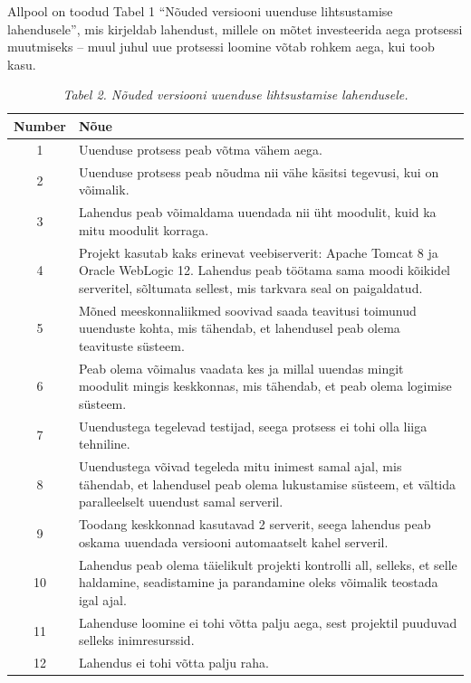 \documentclass[12pt]{report}
\begin{document}
  Allpool on toodud Tabel 1 ``Nõuded versiooni uuenduse lihtsustamise lahendusele'', mis kirjeldab lahendust, millele on mõtet investeerida aega protsessi muutmiseks \--- muul juhul uue protsessi loomine võtab rohkem aega, kui toob kasu.
  
  \begin{table}
    \caption*{\textit{Tabel 2. Nõuded versiooni uuenduse lihtsustamise lahendusele.}}
    
    \begin{tabular}{|c|p{11cm}|}
      \hline
      \textbf{Number} & \textbf{Nõue}\\
      \hline
      1 & Uuenduse protsess peab võtma vähem aega.\\
      \hline
      2 & Uuenduse protsess peab nõudma nii vähe käsitsi tegevusi, kui on võimalik.\\
      \hline
      3 & Lahendus peab võimaldama uuendada nii üht moodulit, kuid ka mitu moodulit korraga.\\
      \hline
      4 & Projekt kasutab kaks erinevat veebiserverit: Apache Tomcat 8 ja Oracle WebLogic 12. Lahendus peab töötama sama moodi kõikidel serveritel, sõltumata sellest, mis tarkvara seal on paigaldatud.\\
      \hline
      5 & Mõned meeskonnaliikmed soovivad saada teavitusi toimunud uuenduste kohta, mis tähendab, et lahendusel peab olema teavituste süsteem.\\
      \hline
      6 & Peab olema võimalus vaadata kes ja millal uuendas mingit moodulit mingis keskkonnas, mis tähendab, et peab olema logimise süsteem.\\
      \hline
      7 & Uuendustega tegelevad testijad, seega protsess ei tohi olla liiga tehniline.\\
      \hline
      8 & Uuendustega võivad tegeleda mitu inimest samal ajal, mis tähendab, et lahendusel peab olema lukustamise süsteem, et vältida paralleelselt uuendust samal serveril.\\
      \hline
      9 & Toodang keskkonnad kasutavad 2 serverit, seega lahendus peab oskama uuendada versiooni automaatselt kahel serveril.\\
      \hline
      10 & Lahendus peab olema täielikult projekti kontrolli all, selleks, et selle haldamine, seadistamine ja parandamine oleks võimalik teostada igal ajal.\\
      \hline
      11 & Lahenduse loomine ei tohi võtta palju aega, sest projektil puuduvad selleks inimresurssid.\\
      \hline
      12 & Lahendus ei tohi võtta palju raha.\\
      \hline
    \end{tabular}
  \end{table}
  
\end{document}
